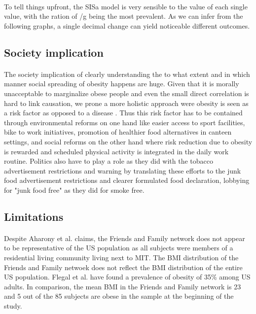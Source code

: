 \documentclass[11pt]{article}
\begin{document}
\paragraph{}
To tell things upfront, the SISa model is very sensible to the value of each single value, with the ration of \beta  \] /g being the most prevalent. As we can infer from the following graphs, a single decimal change can yield noticeable different outcomes.



\subsection{Society implication}
\paragraph{}
The society implication of clearly understanding the to what extent and in which manner social spreading of obesity happens are huge. Given that it is morally unacceptable to marginalize obese people and even the small direct correlation is hard to link causation, we prone a more holistic approach were obesity is seen as a risk factor as opposed to a disease . Thus this risk factor has to be contained through environmental reforms on one hand like easier access to sport facilities, bike to work initiatives, promotion of healthier food alternatives in canteen settings, and social reforms on the other hand where risk reduction due to obesity is rewarded and scheduled physical activity is integrated in the daily work routine. Politics also have to play a role as they did with the tobacco advertisement restrictions and warning by translating these efforts to the junk food advertisement restrictions and clearer formulated food declaration, lobbying for "junk food free" as they did for smoke free.

\subsection{Limitations}
\paragraph{}
Despite Aharony et al. claims, the Friends and Family network does not appear to be representative of the US population as all subjects were members of a residential living community living next to MIT. The BMI distribution of the Friends and Family netwoek does not reflect the BMI distribution of the entire US population. Flegal et al. have found a prevalence of obesity of 35\% among US adults. In comparison, the mean BMI in the Friends and Family network is 23 and 5 out of the 85 subjects are obese in the sample at the beginning of the study.
\end{document}

